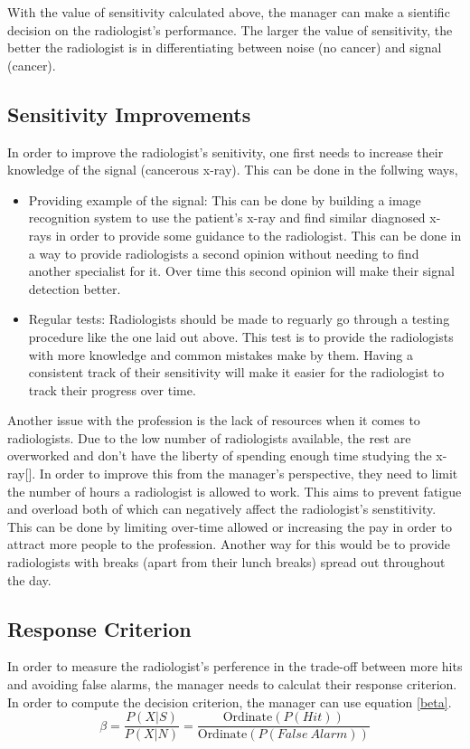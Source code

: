 \documentclass[12pt]{article}
\begin{document}
	With the value of sensitivity calculated above, the manager can make a sientific decision on the radiologist's performance. The larger the value of sensitivity, the better the radiologist is in differentiating between noise (no cancer) and signal (cancer).
	
	\subsection{Sensitivity Improvements}
	
	In order to improve the radiologist's senitivity, one first needs to increase their knowledge of the signal (cancerous x-ray). This can be done in the follwing ways,
	\begin{itemize}
		\item Providing example of the signal: This can be done by building a image recognition system to use the patient's x-ray and find similar diagnosed x-rays in order to provide some guidance to the radiologist. This can be done in a way to provide radiologists a second opinion without needing to find another specialist for it. Over time this second opinion will make their signal detection better.
		\item Regular tests: Radiologists should be made to reguarly go through a testing procedure like the one laid out above. This test is to provide the radiologists with more knowledge and common mistakes make by them. Having a consistent track of their sensitivity will make it easier for the radiologist to track their progress over time.
	\end{itemize}
	
	Another issue with the profession is the lack of resources when it comes to radiologists. Due to the low number of radiologists available, the rest are overworked and don't have the liberty of spending enough time studying the x-ray[]. In order to improve this from the manager's perspective, they need to limit the number of hours a radiologist is allowed to work. This aims to prevent fatigue and overload both of which can negatively affect the radiologist's senstitivity. This can be done by limiting over-time allowed or increasing the pay in order to attract more people to the profession. Another way for this would be to provide radiologists with breaks (apart from their lunch breaks) spread out throughout the day.
	
	\subsection{Response Criterion}
	In order to measure the radiologist's perference in the trade-off between more hits and avoiding false alarms, the manager needs to calculat their response criterion. In order to compute the decision criterion, the manager can use equation \ref{beta}. 
	\begin{equation}
		\beta = \frac{P(X|S)}{P(X|N)} = \frac{\text{Ordinate}(P(Hit))}{\text{Ordinate}(P(False\ Alarm))}
		\label{beta}
	\end{equation}
	
\end{document}
